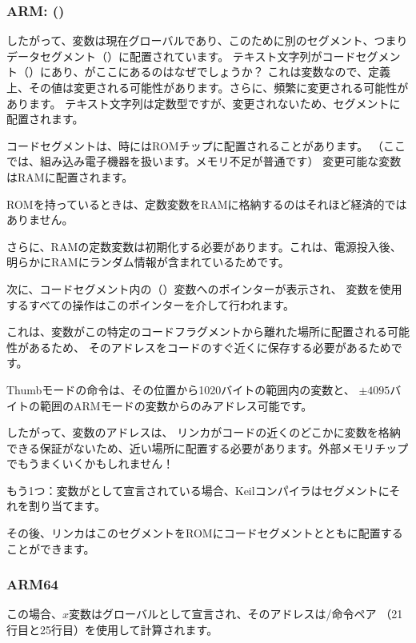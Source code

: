 \subsubsection{ARM: \OptimizingKeilVI (\ThumbMode)}



したがって、変数は現在グローバルであり、このために別のセグメント、つまりデータセグメント（）に配置されています。
テキスト文字列がコードセグメント（）にあり、がここにあるのはなぜでしょうか？
これは変数なので、定義上、その値は変更される可能性があります。さらに、頻繁に変更される可能性があります。
テキスト文字列は定数型ですが、変更されないため、セグメントに配置されます。
\myindex{\RAM}
\myindex{\ROM}

コードセグメントは、時には\ac{ROM}チップに配置されることがあります。
（ここでは、組み込み電子機器を扱います。メモリ不足が普通です）
変更可能な変数は\ac{RAM}に配置されます。

ROMを持っているときは、定数変数をRAMに格納するのはそれほど経済的ではありません。

さらに、RAMの定数変数は初期化する必要があります。これは、電源投入後、明らかにRAMにランダム情報が含まれているためです。


次に、コードセグメント内の（）変数へのポインターが表示され、
変数を使用するすべての操作はこのポインターを介して行われます。

これは、変数がこの特定のコードフラグメントから離れた場所に配置される可能性があるため、
そのアドレスをコードのすぐ近くに保存する必要があるためです。

Thumbモードの命令は、その位置から1020バイトの範囲内の変数と、
$\pm{}4095$バイトの範囲のARMモードの変数からのみアドレス可能です。

したがって、変数のアドレスは、
リンカがコードの近くのどこかに変数を格納できる保証がないため、近い場所に配置する必要があります。外部メモリチップでもうまくいくかもしれません！

\myindex{\ROM}

もう1つ：変数がとして宣言されている場合、Keilコンパイラはセグメントにそれを割り当てます。

その後、リンカはこのセグメントをROMにコードセグメントとともに配置することができます。

\subsubsection{ARM64}




この場合、$x$変数はグローバルとして宣言され、そのアドレスは/命令ペア
（21行目と25行目）を使用して計算されます。
